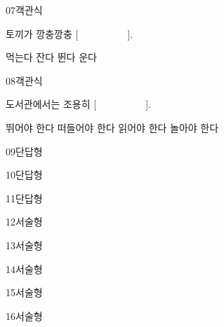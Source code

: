 \documentclass[fs95,seriesFre]{korfarm-base}
\begin{document}
\begin{kfQBlock}{07}{객관식}
\begin{kfEvidence}토끼가 깡충깡충 [　　　　　].\end{kfEvidence}
\begin{kfChoices}
\kfChoice 먹는다
\kfChoice 잔다
\kfChoice 뛴다
\kfChoice 운다
\end{kfChoices}
\end{kfQBlock}
\begin{kfQBlock}{08}{객관식}
\begin{kfEvidence}도서관에서는 조용히 [　　　　　].\end{kfEvidence}
\begin{kfChoices}
\kfChoice 뛰어야 한다
\kfChoice 떠들어야 한다
\kfChoice 읽어야 한다
\kfChoice 놀아야 한다
\end{kfChoices}
\end{kfQBlock}
\begin{kfQBlock}{09}{단답형}
\end{kfQBlock}
\begin{kfQBlock}{10}{단답형}
\end{kfQBlock}
\begin{kfQBlock}{11}{단답형}
\end{kfQBlock}
\begin{kfQBlock}{12}{서술형}
\end{kfQBlock}
\begin{kfQBlock}{13}{서술형}
\end{kfQBlock}
\begin{kfQBlock}{14}{서술형}
\end{kfQBlock}
\begin{kfQBlock}{15}{서술형}
\end{kfQBlock}
\begin{kfQBlock}{16}{서술형}
\end{kfQBlock}
\end{document}
